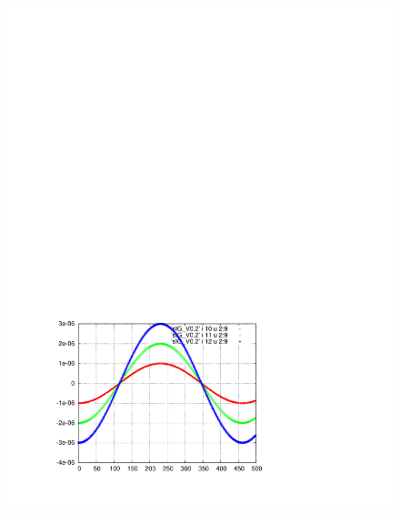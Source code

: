 \documentclass[]{article}
\begin{document}
\begin{figure}[h]
\begin{minipage}[b]{0.45\linewidth}
\includegraphics[scale=0.55]{pdf/delta_vs_turn_V0p2.pdf}
\end{minipage}
%
\hskip 1cm
%
\begin{minipage}[b]{0.45\linewidth}
\centering

\end{minipage}
\end{figure}
\end{document}
